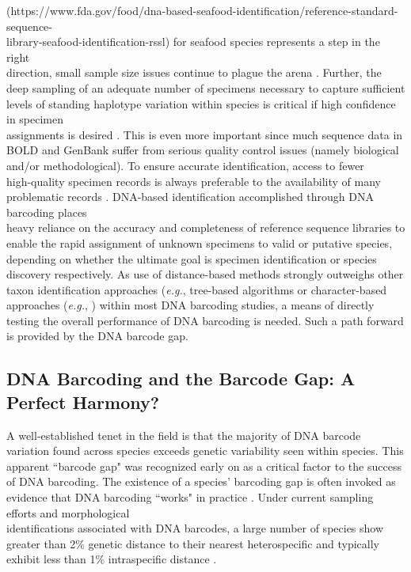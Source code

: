 (https://www.fda.gov/food/dna-based-seafood-identification/reference-standard-sequence-\\library-seafood-identification-rssl) for seafood species represents a step in the right \\ direction, small sample size issues continue to plague the arena \cite{phillips2020hacsim}. Further, the deep sampling of an adequate number of specimens necessary to capture sufficient levels of standing haplotype variation within species is critical if high confidence in specimen \\ assignments is desired \cite{doorenweerd2020highly, phillips2019incomplete, phillips2020hacsim, phillips2015exploration}. This is even more important since much sequence data in BOLD and GenBank suffer from serious quality control issues (namely biological and/or methodological). To ensure accurate identification, access to fewer \\ high-quality specimen records is always preferable to the availability of many problematic records \cite{collins2014known}. DNA-based identification accomplished through DNA barcoding places \\ heavy reliance on the accuracy and completeness of reference sequence libraries to enable the rapid assignment of unknown specimens to valid or putative species, depending on whether the ultimate goal is specimen identification or species discovery respectively.  As use of distance-based methods strongly outweighs other taxon identification approaches (\textit{e.g.}, tree-based algorithms \cite{barbera2019epang} or character-based approaches (\textit{e.g.}, \cite{rach2008character, wong2009identifying}) within most DNA barcoding studies, a means of directly testing the overall performance of DNA barcoding is needed. Such a path forward is provided by the DNA barcode gap.  



\subsection{DNA Barcoding and the Barcode Gap: A Perfect Harmony?}

A well-established tenet in the field is that the majority of DNA barcode variation found across species exceeds genetic variability seen within species. This apparent ``barcode gap" \cite{meyer2005dna} was recognized early on as a critical factor to the success of DNA barcoding. The existence of a species' barcoding gap is often invoked as evidence that DNA barcoding ``works" in practice \cite{stoeckle2014dna}. Under current sampling efforts and morphological \\ identifications associated with DNA barcodes, a large number of species show greater than 2\% genetic distance to their nearest heterospecific and typically exhibit less than 1\% intraspecific distance \cite{hubert2015dna}. 



